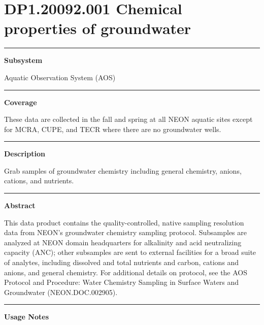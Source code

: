 \documentclass[]{article}
\begin{document}
\section{DP1.20092.001 Chemical properties of
groundwater}\label{dp1.20092.001-chemical-properties-of-groundwater}

\begin{center}\rule{0.5\linewidth}{\linethickness}\end{center}

\textbf{Subsystem}

Aquatic Observation System (AOS)

\begin{center}\rule{0.5\linewidth}{\linethickness}\end{center}

\textbf{Coverage}

These data are collected in the fall and spring at all NEON aquatic
sites except for MCRA, CUPE, and TECR where there are no groundwater
wells.

\begin{center}\rule{0.5\linewidth}{\linethickness}\end{center}

\textbf{Description}

Grab samples of groundwater chemistry including general chemistry,
anions, cations, and nutrients.

\begin{center}\rule{0.5\linewidth}{\linethickness}\end{center}

\textbf{Abstract}

This data product contains the quality-controlled, native sampling
resolution data from NEON's groundwater chemistry sampling protocol.
Subsamples are analyzed at NEON domain headquarters for alkalinity and
acid neutralizing capacity (ANC); other subsamples are sent to external
facilities for a broad suite of analytes, including dissolved and total
nutrients and carbon, cations and anions, and general chemistry. For
additional details on protocol, see the AOS Protocol and Procedure:
Water Chemistry Sampling in Surface Waters and Groundwater
(NEON.DOC.002905).

\begin{center}\rule{0.5\linewidth}{\linethickness}\end{center}

\textbf{Usage Notes}
\end{document}
